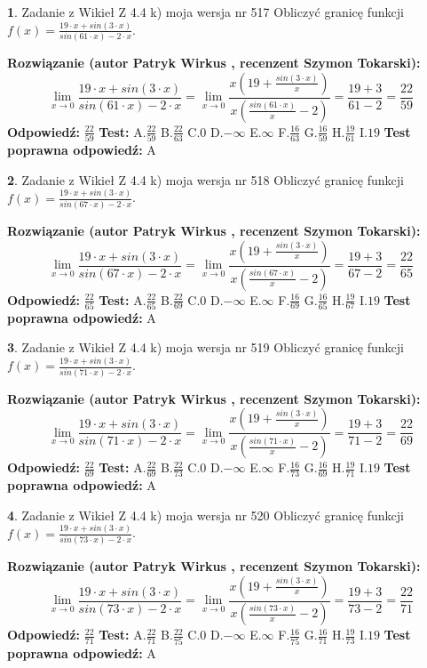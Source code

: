 \documentclass[12pt, a4paper]{article}
\theoremstyle{definition} %
\newtheorem{zad}{}
\newcommand{\zadStart}[1]{\begin{zad}#1\newline}
\newcommand{\zadStop}{\end{zad}}
\newcommand{\rozwStart}[2]{\noindent \textbf{Rozwiązanie (autor #1 , recenzent #2): }\newline}
\newcommand{\rozwStop}{\newline}
\newcommand{\odpStart}{\noindent \textbf{Odpowiedź:}\newline}
\newcommand{\odpStop}{\newline}
\newcommand{\testStart}{\noindent \textbf{Test:}\newline}
\newcommand{\testStop}{\newline}
\newcommand{\kluczStart}{\noindent \textbf{Test poprawna odpowiedź:}\newline}
\newcommand{\kluczStop}{\newline}
\begin{document}
\zadStart{Zadanie z Wikieł Z 4.4 k) moja wersja nr 517}
Obliczyć granicę funkcji $f(x)=\frac{19\cdot x +sin(3\cdot x)}{sin(61\cdot x) -2\cdot x}$.
\zadStop
\rozwStart{Patryk Wirkus}{Szymon Tokarski}
$$\lim\limits_{x\to 0}\frac{19\cdot x +sin(3\cdot x)}{sin(61\cdot x) -2\cdot x}
=\lim\limits_{x\to 0}\frac{x(19+\frac{sin(3\cdot x)}{x})}{x(\frac{sin(61\cdot x)}{x}-2)}
=\frac{19+3}{61-2} = \frac{22}{59}$$
\rozwStop
\odpStart
$\frac{22}{59}$
\odpStop
\testStart
A.$\frac{22}{59}$
B.$\frac{22}{63}$
C.$0$
D.$-\infty$
E.$\infty$
F.$\frac{16}{63}$
G.$\frac{16}{59}$
H.$\frac{19}{61}$
I.$19$
\testStop
\kluczStart
A
\kluczStop



\zadStart{Zadanie z Wikieł Z 4.4 k) moja wersja nr 518}
Obliczyć granicę funkcji $f(x)=\frac{19\cdot x +sin(3\cdot x)}{sin(67\cdot x) -2\cdot x}$.
\zadStop
\rozwStart{Patryk Wirkus}{Szymon Tokarski}
$$\lim\limits_{x\to 0}\frac{19\cdot x +sin(3\cdot x)}{sin(67\cdot x) -2\cdot x}
=\lim\limits_{x\to 0}\frac{x(19+\frac{sin(3\cdot x)}{x})}{x(\frac{sin(67\cdot x)}{x}-2)}
=\frac{19+3}{67-2} = \frac{22}{65}$$
\rozwStop
\odpStart
$\frac{22}{65}$
\odpStop
\testStart
A.$\frac{22}{65}$
B.$\frac{22}{69}$
C.$0$
D.$-\infty$
E.$\infty$
F.$\frac{16}{69}$
G.$\frac{16}{65}$
H.$\frac{19}{67}$
I.$19$
\testStop
\kluczStart
A
\kluczStop



\zadStart{Zadanie z Wikieł Z 4.4 k) moja wersja nr 519}
Obliczyć granicę funkcji $f(x)=\frac{19\cdot x +sin(3\cdot x)}{sin(71\cdot x) -2\cdot x}$.
\zadStop
\rozwStart{Patryk Wirkus}{Szymon Tokarski}
$$\lim\limits_{x\to 0}\frac{19\cdot x +sin(3\cdot x)}{sin(71\cdot x) -2\cdot x}
=\lim\limits_{x\to 0}\frac{x(19+\frac{sin(3\cdot x)}{x})}{x(\frac{sin(71\cdot x)}{x}-2)}
=\frac{19+3}{71-2} = \frac{22}{69}$$
\rozwStop
\odpStart
$\frac{22}{69}$
\odpStop
\testStart
A.$\frac{22}{69}$
B.$\frac{22}{73}$
C.$0$
D.$-\infty$
E.$\infty$
F.$\frac{16}{73}$
G.$\frac{16}{69}$
H.$\frac{19}{71}$
I.$19$
\testStop
\kluczStart
A
\kluczStop



\zadStart{Zadanie z Wikieł Z 4.4 k) moja wersja nr 520}
Obliczyć granicę funkcji $f(x)=\frac{19\cdot x +sin(3\cdot x)}{sin(73\cdot x) -2\cdot x}$.
\zadStop
\rozwStart{Patryk Wirkus}{Szymon Tokarski}
$$\lim\limits_{x\to 0}\frac{19\cdot x +sin(3\cdot x)}{sin(73\cdot x) -2\cdot x}
=\lim\limits_{x\to 0}\frac{x(19+\frac{sin(3\cdot x)}{x})}{x(\frac{sin(73\cdot x)}{x}-2)}
=\frac{19+3}{73-2} = \frac{22}{71}$$
\rozwStop
\odpStart
$\frac{22}{71}$
\odpStop
\testStart
A.$\frac{22}{71}$
B.$\frac{22}{75}$
C.$0$
D.$-\infty$
E.$\infty$
F.$\frac{16}{75}$
G.$\frac{16}{71}$
H.$\frac{19}{73}$
I.$19$
\testStop
\kluczStart
A
\kluczStop
\end{document}
